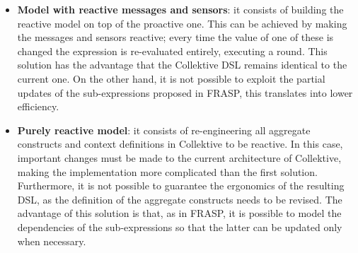 \begin{itemize}
    \item \textbf{Model with reactive messages and sensors}: it consists of building the reactive model on top of the proactive one. This can be achieved by making the messages and sensors reactive; every time the value of one of these is changed the expression is re-evaluated entirely, executing a round. This solution has the advantage that the Collektive DSL remains identical to the current one. On the other hand, it is not possible to exploit the partial updates of the sub-expressions proposed in FRASP, this translates into lower efficiency.
    \item \textbf{Purely reactive model}: it consists of re-engineering all aggregate constructs and context definitions in Collektive to be reactive. In this case, important changes must be made to the current architecture of Collektive, making the implementation more complicated than the first solution. Furthermore, it is not possible to guarantee the ergonomics of the resulting DSL, as the definition of the aggregate constructs needs to be revised. The advantage of this solution is that, as in FRASP, it is possible to model the dependencies of the sub-expressions so that the latter can be updated only when necessary.
\end{itemize}
